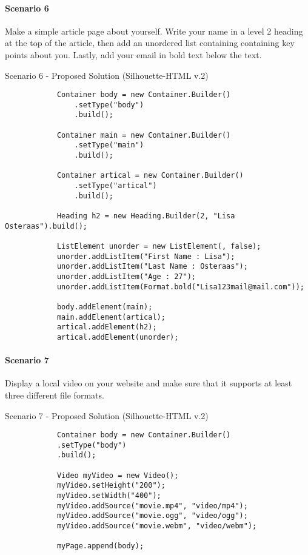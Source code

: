 \documentclass[12pt]{article}
\begin{document}
        \paragraph{Scenario 6}
        Make a simple article page about yourself. Write your name in a level 2 heading at the top of the article, then add an unordered list containing containing key points about you. Lastly, add your email in bold text below the text.

        \begin{shaded}
            Scenario 6 - Proposed Solution (Silhouette-HTML v.2)
            \begin{lstlisting}
            Container body = new Container.Builder()
                .setType("body")
                .build();

            Container main = new Container.Builder()
                .setType("main")
                .build();

            Container artical = new Container.Builder()
                .setType("artical")
                .build();

            Heading h2 = new Heading.Builder(2, "Lisa Osteraas").build();
                                        
            ListElement unorder = new ListElement(, false);
            unorder.addListItem("First Name : Lisa");
            unorder.addListItem("Last Name : Osteraas");
            unorder.addListItem("Age : 27");
            unorder.addListItem(Format.bold("Lisa123mail@mail.com"));

            body.addElement(main);
            main.addElement(artical);
            artical.addElement(h2);
            artical.addElement(unorder);
            \end{lstlisting}
        \end{shaded}

        \paragraph{Scenario 7}
        Display a local video on your website and make sure that it supports at least three different file formats.

        \begin{shaded}
            Scenario 7 - Proposed Solution (Silhouette-HTML v.2)
            \begin{lstlisting}
            Container body = new Container.Builder()
            .setType("body")
            .build();

            Video myVideo = new Video();
            myVideo.setHeight("200");
            myVideo.setWidth("400");
            myVideo.addSource("movie.mp4", "video/mp4");
            myVideo.addSource("movie.ogg", "video/ogg");
            myVideo.addSource("movie.webm", "video/webm");

            myPage.append(body);
            \end{lstlisting}
        \end{shaded}
\end{document}
